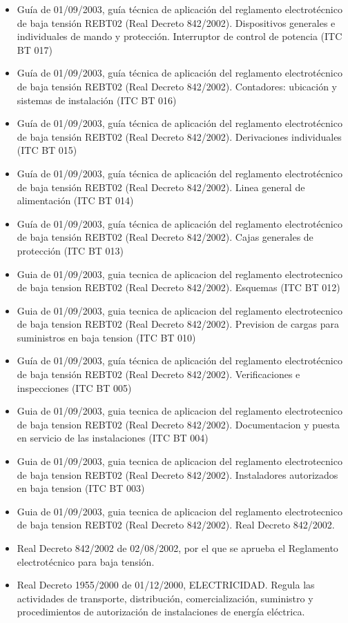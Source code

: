 \documentclass[../main.tex]{subfiles}
\begin{document}
\begin{itemize}
    \item Guía de 01/09/2003, guía técnica de aplicación del reglamento electrotécnico de baja tensión REBT02 (Real Decreto 842/2002). Dispositivos generales e individuales de mando y protección. Interruptor de control de potencia (ITC BT 017)
    \item Guía de 01/09/2003, guía técnica de aplicación del reglamento electrotécnico de baja tensión REBT02 (Real Decreto 842/2002). Contadores: ubicación y sistemas de instalación (ITC BT 016)
    \item Guía de 01/09/2003, guía técnica de aplicación del reglamento electrotécnico de baja tensión REBT02 (Real Decreto 842/2002). Derivaciones individuales (ITC BT 015)
    \item Guía de 01/09/2003, guía técnica de aplicación del reglamento electrotécnico de baja tensión REBT02 (Real Decreto 842/2002). Linea general de alimentación (ITC BT 014)
    \item Guía de 01/09/2003, guía técnica de aplicación del reglamento electrotécnico de baja tensión REBT02 (Real Decreto 842/2002). Cajas generales de protección (ITC BT 013)
    \item Guia de 01/09/2003, guia tecnica de aplicacion del reglamento electrotecnico de baja tension REBT02 (Real Decreto 842/2002). Esquemas (ITC BT 012)
    \item Guia de 01/09/2003, guia tecnica de aplicacion del reglamento electrotecnico de baja tension REBT02 (Real Decreto 842/2002). Prevision de cargas para suministros en baja tension (ITC BT 010)
    \item Guía de 01/09/2003, guía técnica de aplicación del reglamento electrotécnico de baja tensión REBT02 (Real Decreto 842/2002). Verificaciones e inspecciones (ITC BT 005)
    \item Guia de 01/09/2003, guia tecnica de aplicacion del reglamento electrotecnico de baja tension REBT02 (Real Decreto 842/2002). Documentacion y puesta en servicio de las instalaciones (ITC BT 004)
    \item Guia de 01/09/2003, guia tecnica de aplicacion del reglamento electrotecnico de baja tension REBT02 (Real Decreto 842/2002). Instaladores autorizados en baja tension (ITC BT 003)
    \item Guia de 01/09/2003, guia tecnica de aplicacion del reglamento electrotecnico de baja tension REBT02 (Real Decreto 842/2002). Real Decreto 842/2002.
    \item Real Decreto 842/2002 de 02/08/2002, por el que se aprueba el Reglamento electrotécnico para baja tensión.
    \item Real Decreto 1955/2000 de 01/12/2000, ELECTRICIDAD. Regula las actividades de transporte, distribución, comercialización, suministro y procedimientos de autorización de instalaciones de energía eléctrica.
\end{itemize}
\end{document}
